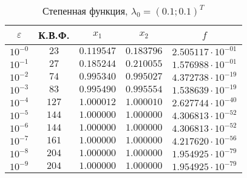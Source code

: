 \documentclass[a4paper,12pt,notitlepage,pdftex,headsepline]{scrartcl}
\begin{document}
        \begin{table}[ht]
          \centering
          \caption{Степенная функция, $\lambda_0 = (0.1; 0.1)^T$}
          \begin{tabular}{|c|c|c|c|c|}
            \hline
            $\varepsilon$ & К.В.Ф. & $x_1$ & $x_2$ & $f$\\
            \hline
            $10^{-0}$ & $23$ & $0.119547$ & $0.183796$ & $2.505117\cdot 10^{-01}$\\
            $10^{-1}$ & $27$ & $0.185244$ & $0.210055$ & $1.576988\cdot 10^{-01}$\\
            $10^{-2}$ & $74$ & $0.995340$ & $0.995027$ & $4.372738\cdot 10^{-19}$\\
            $10^{-3}$ & $83$ & $0.995490$ & $0.995554$ & $1.538639\cdot 10^{-19}$\\
            $10^{-4}$ & $127$ & $1.000012$ & $1.000010$ & $2.627744\cdot 10^{-40}$\\
            $10^{-5}$ & $144$ & $1.000000$ & $1.000000$ & $4.306813\cdot 10^{-52}$\\
            $10^{-6}$ & $144$ & $1.000000$ & $1.000000$ & $4.306813\cdot 10^{-52}$\\
            $10^{-7}$ & $161$ & $1.000000$ & $1.000000$ & $4.217620\cdot 10^{-56}$\\
            $10^{-8}$ & $204$ & $1.000000$ & $1.000000$ & $1.954925\cdot 10^{-79}$\\
            $10^{-9}$ & $204$ & $1.000000$ & $1.000000$ & $1.954925\cdot 10^{-79}$\\
            \hline
          \end{tabular}
        \end{table}
\end{document}
